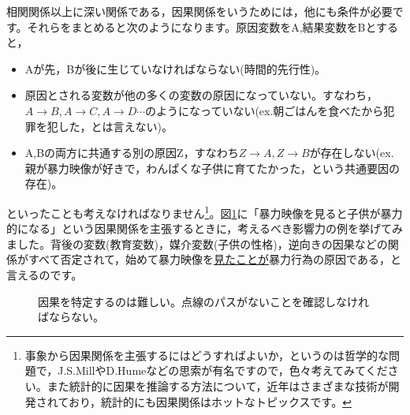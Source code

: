 \documentclass{ltjbook}
\begin{document}
相関関係以上に深い関係である，因果関係をいうためには，他にも条件が必要です。それらをまとめると次のようになります。原因変数をA,結果変数をBとすると，
\begin{itemize}
	\item Aが先，Bが後に生じていなければならない(時間的先行性)。
	\item 原因とされる変数が他の多くの変数の原因になっていない。すなわち，$A \to B, A \to C, A \to D \cdots$のようになっていない(ex.朝ごはんを食べたから犯罪を犯した，とは言えない)。
	\item A,Bの両方に共通する別の原因Z，すなわち$Z \to A, Z \to B$が存在しない(ex.親が暴力映像が好きで，わんぱくな子供に育てたかった，という共通要因の存在)。
\end{itemize}
といったことも考えなければなりません\footnote{事象から因果関係を主張するにはどうすればよいか，というのは哲学的な問題で，J.S.MillやD.Humeなどの思索が有名ですので，色々考えてみてください。また統計的に因果を推論する方法について，近年はさまざまな技術が開発されており，統計的にも因果関係はホットなトピックスです。}。図\ref{fig::m08_causal}に「暴力映像を見ると子供が暴力的になる」という因果関係を主張するときに，考えるべき影響力の例を挙げてみました。背後の変数(教育変数)，媒介変数(子供の性格)，逆向きの因果などの関係がすべて否定されて，始めて暴力映像を\underline{見たことが}暴力行為の原因である，と言えるのです。

\begin{figure}[ht]
	\centering
	\caption{因果を特定するのは難しい。点線のパスがないことを確認しなければならない。}
	\label{fig::m08_causal}
\end{figure}
\end{document}
